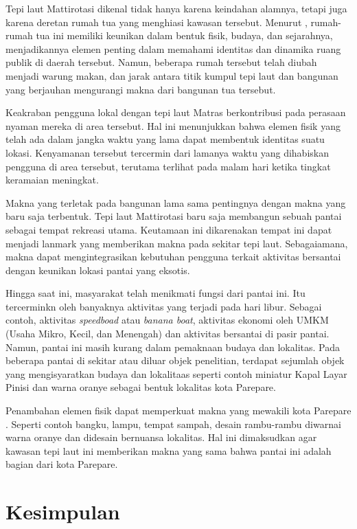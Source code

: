 \documentclass[11pt]{simart} %
\begin{document}
Tepi laut Mattirotasi dikenal tidak hanya karena keindahan alamnya, tetapi juga karena deretan rumah tua yang menghiasi kawasan tersebut. Menurut \cite{iqbal2020}, rumah-rumah tua ini memiliki keunikan dalam bentuk fisik, budaya, dan sejarahnya, menjadikannya elemen penting dalam memahami identitas dan dinamika ruang publik di daerah tersebut.
Namun, beberapa rumah tersebut telah diubah menjadi warung makan, dan jarak antara titik kumpul tepi laut dan bangunan yang berjauhan mengurangi makna dari bangunan tua tersebut.

Keakraban pengguna lokal dengan tepi laut Matras berkontribusi pada perasaan nyaman mereka di area tersebut.
Hal ini menunjukkan bahwa elemen fisik yang telah ada dalam jangka waktu yang lama dapat membentuk identitas suatu lokasi.
Kenyamanan tersebut tercermin dari lamanya waktu yang dihabiskan pengguna di area tersebut, terutama terlihat pada malam hari ketika tingkat keramaian meningkat.

Makna yang terletak pada bangunan lama sama pentingnya dengan makna yang baru saja terbentuk. Tepi laut Mattirotasi baru saja membangun sebuah pantai sebagai tempat rekreasi utama. Keutamaan ini dikarenakan tempat ini dapat menjadi lanmark yang memberikan makna pada sekitar tepi laut.
Sebagaiamana, makna dapat mengintegrasikan kebutuhan pengguna terkait aktivitas bersantai dengan keunikan lokasi pantai yang eksotis.

Hingga saat ini, masyarakat telah menikmati fungsi dari pantai ini. Itu tercerminkn oleh banyaknya aktivitas yang terjadi pada hari libur. Sebagai contoh, aktivitas \textit{speedboad} atau \textit{banana boat}, aktivitas ekonomi oleh UMKM (Usaha Mikro, Kecil, dan Menengah) dan aktivitas bersantai di pasir pantai.
Namun, pantai ini masih kurang dalam pemaknaan budaya dan lokalitas. Pada beberapa pantai di sekitar atau diluar objek penelitian, terdapat sejumlah objek yang mengisyaratkan budaya dan lokalitaas seperti contoh miniatur Kapal Layar Pinisi dan warna oranye sebagai bentuk lokalitas kota Parepare.

Penambahan elemen fisik dapat memperkuat makna yang mewakili kota Parepare \citep{atika2022}. Seperti contoh bangku, lampu, tempat sampah, desain rambu-rambu diwarnai warna oranye dan didesain bernuansa lokalitas. Hal ini dimaksudkan agar kawasan tepi laut ini memberikan makna yang sama bahwa pantai ini adalah bagian dari kota Parepare.



\section{Kesimpulan}%
\label{sec:Kesimpulan}
\end{document}
